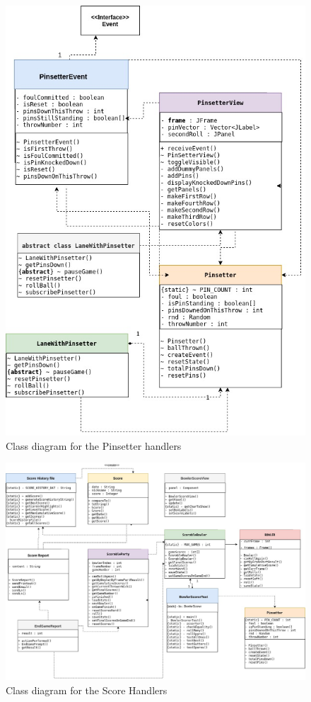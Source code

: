 \begin{figure}[H]
    \centering
    \includegraphics[width = \textwidth]{uml/Pinsetter_class.jpg}
    \caption{Class diagram for the Pinsetter handlers}
\end{figure}

\begin{figure}[H]
    \centering
    \includegraphics[width = \textwidth]{uml/Score_class.jpg}
    \caption{Class diagram for the Score Handlers}
\end{figure}

